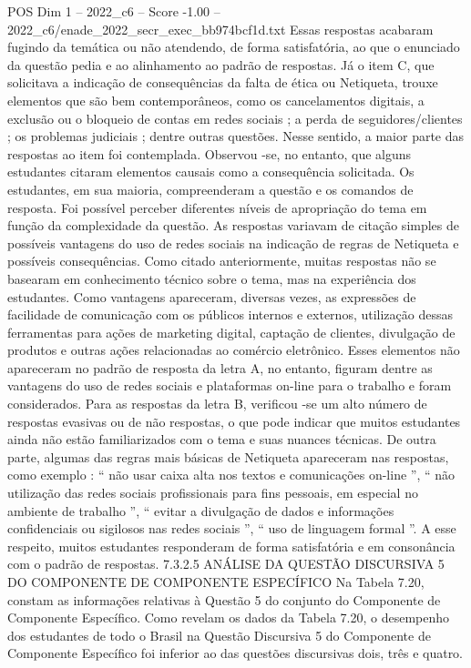 \begin{textsample}{POS Dim 1 – 2022\_c6 – Score -1.00 – 2022\_c6/enade\_2022\_secr\_exec\_bb974bcf1d.txt}
Essas respostas acabaram fugindo da temática ou não atendendo, de forma satisfatória, ao que o enunciado da questão pedia e ao alinhamento ao padrão de respostas.
Já o item C, que solicitava a indicação de consequências da falta de ética ou Netiqueta, trouxe elementos que são bem contemporâneos, como os cancelamentos digitais, a exclusão ou o bloqueio de contas em redes sociais ; a perda de seguidores/clientes ; os problemas judiciais ; dentre outras questões.
Nesse sentido, a maior parte das respostas ao item foi contemplada.
Observou -se, no entanto, que alguns estudantes citaram elementos causais como a consequência solicitada.
Os estudantes, em sua maioria, compreenderam a questão e os comandos de resposta.
Foi possível perceber diferentes níveis de apropriação do tema em função da complexidade da questão.
As respostas variavam de citação simples de possíveis vantagens do uso de redes sociais na indicação de regras de Netiqueta e possíveis consequências.
Como citado anteriormente, muitas respostas não se basearam em conhecimento técnico sobre o tema, mas na experiência dos estudantes.
Como vantagens apareceram, diversas vezes, as expressões de facilidade de comunicação com os públicos internos e externos, utilização dessas ferramentas para ações de marketing digital, captação de clientes, divulgação de produtos e outras ações relacionadas ao comércio eletrônico.
Esses elementos não apareceram no padrão de resposta da letra A, no entanto, figuram dentre as vantagens do uso de redes sociais e plataformas on-line para o trabalho e foram considerados.
Para as respostas da letra B, verificou -se um alto número de respostas evasivas ou de não respostas, o que pode indicar que muitos estudantes ainda não estão familiarizados com o tema e suas nuances técnicas.
De outra parte, algumas das regras mais básicas de Netiqueta apareceram nas respostas, como exemplo : “ não usar caixa alta nos textos e comunicações on-line ”, “ não utilização das redes sociais profissionais para fins pessoais, em especial no ambiente de trabalho ”, “ evitar a divulgação de dados e informações confidenciais ou sigilosos nas redes sociais ”, “ uso de linguagem formal ”.
A esse respeito, muitos estudantes responderam de forma satisfatória e em consonância com o padrão de respostas. 7.3.2.5 ANÁLISE DA QUESTÃO DISCURSIVA 5 DO COMPONENTE DE COMPONENTE ESPECÍFICO Na Tabela 7.20, constam as informações relativas à Questão 5 do conjunto do Componente de Componente Específico.
Como revelam os dados da Tabela 7.20, o desempenho dos estudantes de todo o Brasil na Questão Discursiva 5 do Componente de Componente Específico foi inferior ao das questões discursivas dois, três e quatro.

\end{textsample}
